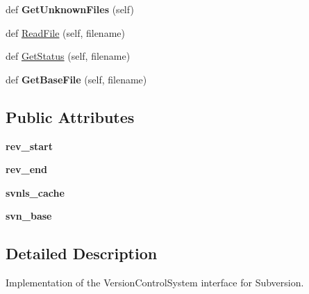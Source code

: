 \begin{DoxyCompactItemize}
\item 
def {\bfseries Get\+Unknown\+Files} (self)\hypertarget{classupload_1_1SubversionVCS_a494ba1010992d83cac015bc396ab693a}{}\label{classupload_1_1SubversionVCS_a494ba1010992d83cac015bc396ab693a}

\item 
def \hyperlink{classupload_1_1SubversionVCS_a340d269b74386ac863636f6b0683d9f4}{Read\+File} (self, filename)
\item 
def \hyperlink{classupload_1_1SubversionVCS_ac3785eb1fa561088206d01570f9fe982}{Get\+Status} (self, filename)
\item 
def {\bfseries Get\+Base\+File} (self, filename)\hypertarget{classupload_1_1SubversionVCS_a29dec4941de0824734d6842a2f33ffc3}{}\label{classupload_1_1SubversionVCS_a29dec4941de0824734d6842a2f33ffc3}

\end{DoxyCompactItemize}
\subsection*{Public Attributes}
\begin{DoxyCompactItemize}
\item 
{\bfseries rev\+\_\+start}\hypertarget{classupload_1_1SubversionVCS_ad1553a69f4a790309273dbdeb9077732}{}\label{classupload_1_1SubversionVCS_ad1553a69f4a790309273dbdeb9077732}

\item 
{\bfseries rev\+\_\+end}\hypertarget{classupload_1_1SubversionVCS_ac0bb07a099c722b7f8622de4b225904f}{}\label{classupload_1_1SubversionVCS_ac0bb07a099c722b7f8622de4b225904f}

\item 
{\bfseries svnls\+\_\+cache}\hypertarget{classupload_1_1SubversionVCS_aa801782f807674b06f491df5d7ca9942}{}\label{classupload_1_1SubversionVCS_aa801782f807674b06f491df5d7ca9942}

\item 
{\bfseries svn\+\_\+base}\hypertarget{classupload_1_1SubversionVCS_a60645c40d2fea4cd52881576bd13341f}{}\label{classupload_1_1SubversionVCS_a60645c40d2fea4cd52881576bd13341f}

\end{DoxyCompactItemize}


\subsection{Detailed Description}
\begin{DoxyVerb}Implementation of the VersionControlSystem interface for Subversion.\end{DoxyVerb}
 

